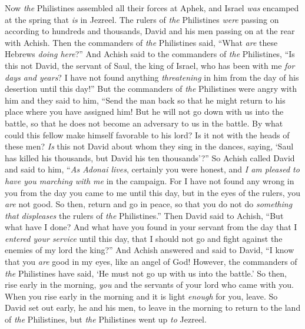 \begin{biblechapter} %
 Now \textit{the} Philistines assembled all their forces at Aphek, and Israel \textit{was} encamped at the spring that \textit{is} in Jezreel.
\verse The rulers of \textit{the} Philistines \textit{were} passing on according to hundreds and thousands, David and his men passing on at the rear with Achish.
\verse Then the commanders of \textit{the} Philistines said, “What \textit{are} these Hebrews \textit{doing here}?” And Achish said to the commanders of \textit{the} Philistines, “Is this not David, the servant of Saul, the king of Israel, who has been with me \textit{for days and years}? I have not found anything \textit{threatening} in him from the day of his desertion until this day!”
\verse But the commanders of \textit{the} Philistines were angry with him and they said to him, “Send the man back so that he might return to his place where you have assigned him! But he will not go down with us into the battle, so that he does not become an adversary to us in the battle. By what could this fellow make himself favorable to his lord? Is it not with the heads of these men?
\verse \textit{Is} this not David about whom they sing in the dances, saying, ‘Saul has killed his thousands, 
but David his ten thousands’?”
\verse So Achish called David and said to him, “\textit{As Adonai lives}, certainly you were honest, and \textit{I am pleased to have you marching with me} in the campaign. For I have not found any wrong in you from the day you came to me until this day, but in the eyes of the rulers, you \textit{are} not good.
\verse So then, return and go in peace, so that you do not do \textit{something that displeases} the rulers of \textit{the} Philistines.”
\verse Then David said to Achish, “But what have I done? And what have you found in your servant from the day that I \textit{entered your service} until this day, that I should not go and fight against the enemies of my lord the king?”
\verse And Achish answered and said to David, “I know that you \textit{are} good in my eyes, like an angel of God! However, the commanders of \textit{the} Philistines have said, ‘He must not go up with us into the battle.’
\verse So then, rise early in the morning, \textit{you} and the servants of your lord who came with you. When you rise early in the morning and it is light \textit{enough} for you, leave.
\verse So David set out early, he and his men, to leave in the morning to return to the land of \textit{the} Philistines, but \textit{the} Philistines went up \textit{to} Jezreel.
\end{biblechapter}

